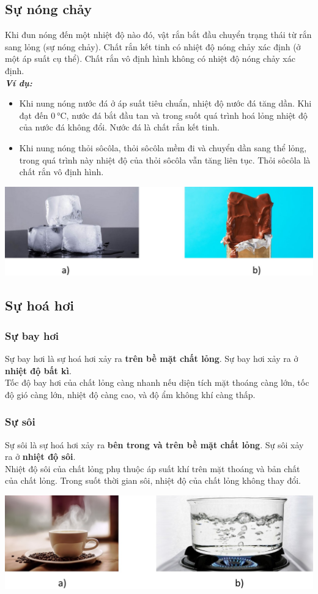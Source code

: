 \subsection{Sự nóng chảy}
Khi đun nóng đến một nhiệt độ nào đó, vật rắn bắt đầu chuyển trạng thái từ rắn sang lỏng (sự nóng chảy). Chất rắn kết tinh có nhiệt độ nóng chảy xác định (ở một áp suất cụ thể). Chất rắn vô định hình không có nhiệt độ nóng chảy xác định.\\
\textbf{\textit{Ví dụ:}}
\begin{itemize}
	\item Khi nung nóng nước đá ở áp suất tiêu chuẩn, nhiệt độ nước đá tăng dần. Khi đạt đến $\SI{0}{\celsius}$, nước đá bắt đầu tan và trong suốt quá trình hoá lỏng nhiệt độ của nước đá không đổi. Nước đá là chất rắn kết tinh.
	\item Khi nung nóng thỏi sôcôla, thỏi sôcôla mềm đi và chuyển dần sang thể lỏng, trong quá trình này nhiệt độ của thỏi sôcôla vẫn tăng liên tục. Thỏi sôcôla là chất rắn vô định hình.
\end{itemize}
\begin{center}
	\includegraphics[width=0.6\linewidth]{../figs/VN12-Y24-PH-SYL-001-5}
\end{center}
\subsection{Sự hoá hơi}
\subsubsection{Sự bay hơi}
Sự bay hơi là sự hoá hơi xảy ra \textbf{trên bề mặt chất lỏng}. Sự bay hơi xảy ra ở \textbf{nhiệt độ bất kì}.\\
Tốc độ bay hơi của chất lỏng càng nhanh nếu diện tích mặt thoáng càng lớn, tốc độ gió càng lớn, nhiệt độ càng cao, và độ ẩm không khí càng thấp.
\subsubsection{Sự sôi}
Sự sôi là sự hoá hơi xảy ra \textbf{bên trong và trên bề mặt chất lỏng}. Sự sôi xảy ra ở \textbf{nhiệt độ sôi}.\\
Nhiệt độ sôi của chất lỏng phụ thuộc áp suất khí trên mặt thoáng và bản chất của chất lỏng. Trong suốt thời gian sôi, nhiệt độ của chất lỏng không thay đổi.
\begin{center}
	
	\includegraphics[width=0.65\linewidth]{../figs/VN12-Y24-PH-SYL-001-6}
\end{center}

